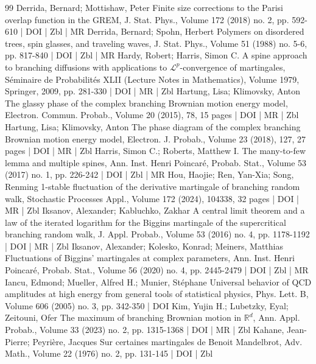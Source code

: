 \begin{thebibliography}{99}
 Derrida, Bernard; Mottishaw, Peter Finite size corrections to the Parisi overlap function in the GREM, J. Stat. Phys., Volume 172 (2018) no. 2, pp. 592-610 | DOI | Zbl | MR
 Derrida, Bernard; Spohn, Herbert Polymers on disordered trees, spin glasses, and traveling waves, J. Stat. Phys., Volume 51 (1988) no. 5-6, pp. 817-840 | DOI | Zbl | MR
 Hardy, Robert; Harris, Simon C. A spine approach to branching diffusions with applications to $\mathscr{L}^p$-convergence of martingales, Séminaire de Probabilités XLII (Lecture Notes in Mathematics), Volume 1979, Springer, 2009, pp. 281-330 | DOI | MR | Zbl
 Hartung, Lisa; Klimovsky, Anton The glassy phase of the complex branching Brownian motion energy model, Electron. Commun. Probab., Volume 20 (2015), 78, 15 pages | DOI | MR | Zbl
 Hartung, Lisa; Klimovsky, Anton The phase diagram of the complex branching Brownian motion energy model, Electron. J. Probab., Volume 23 (2018), 127, 27 pages | DOI | MR | Zbl
 Harris, Simon C.; Roberts, Matthew I. The many-to-few lemma and multiple spines, Ann. Inst. Henri Poincaré, Probab. Stat., Volume 53 (2017) no. 1, pp. 226-242 | DOI | Zbl | MR
 Hou, Haojie; Ren, Yan-Xia; Song, Renming 1-stable fluctuation of the derivative martingale of branching random walk, Stochastic Processes Appl., Volume 172 (2024), 104338, 32 pages | DOI | MR | Zbl
 Iksanov, Alexander; Kabluchko, Zakhar A central limit theorem and a law of the iterated logarithm for the Biggins martingale of the supercritical branching random walk, J. Appl. Probab., Volume 53 (2016) no. 4, pp. 1178-1192 | DOI | MR | Zbl
 Iksanov, Alexander; Kolesko, Konrad; Meiners, Matthias Fluctuations of Biggins’ martingales at complex parameters, Ann. Inst. Henri Poincaré, Probab. Stat., Volume 56 (2020) no. 4, pp. 2445-2479 | DOI | Zbl | MR
 Iancu, Edmond; Mueller, Alfred H.; Munier, Stéphane Universal behavior of QCD amplitudes at high energy from general tools of statistical physics, Phys. Lett. B, Volume 606 (2005) no. 3, pp. 342-350 | DOI
 Kim, Yujin H.; Lubetzky, Eyal; Zeitouni, Ofer The maximum of branching Brownian motion in $\mathbb{R}^d$, Ann. Appl. Probab., Volume 33 (2023) no. 2, pp. 1315-1368 | DOI | MR | Zbl
 Kahane, Jean-Pierre; Peyrière, Jacques Sur certaines martingales de Benoit Mandelbrot, Adv. Math., Volume 22 (1976) no. 2, pp. 131-145 | DOI | Zbl

\end{thebibliography}

